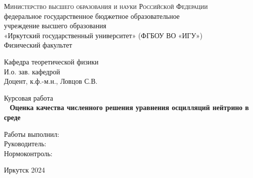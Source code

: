 \documentclass[a4paper,12pt]{article}
\begin{document}
	\onehalfspacing
	\pagestyle{plain}
	
	\begin{titlepage}
		\begin{center}
			{%
				\scshape
				Министерство высшего образования и науки Российской Федерации\\
			}
			федеральное государственное бюджетное образовательное \\
			учреждение высшего образования \\
			«Иркутский государственный университет»
			(ФГБОУ ВО «ИГУ»)\\
			Физический факультет
		\end{center}
		\vspace*{3em}
		
		\begin{flushright}
			\begin{minipage}{60mm}
				Кафедра теоретической физики\\
				И.о. зав. кафедрой\\
				Доцент, к.ф.-м.н., \underline{\hspace{20mm}} Ловцов С.В.
			\end{minipage}
		\end{flushright}
		\vspace*{4em}
		
		\begin{center}
			\large%
			Курсовая работа\\[2ex]\
			\Large\bfseries%
			Оценка качества численного решения уравнения осцилляций нейтрино в среде
		\end{center}
		
		\vspace*{3em}
		
		\begin{flushright}
			\begin{minipage}{70mm}
				Работы выполнил: \underline{\hspace{30mm}}
				\\[2ex]
				Руководитель: \underline{\hspace{30mm}}\\[2ex]
				Нормоконтроль: \underline{\hspace{30mm}}
			\end{minipage}
		\end{flushright}
		
		\vfill
		\begin{center}
			Иркутск 2024
		\end{center}
	\end{titlepage}
	
\end{document}
